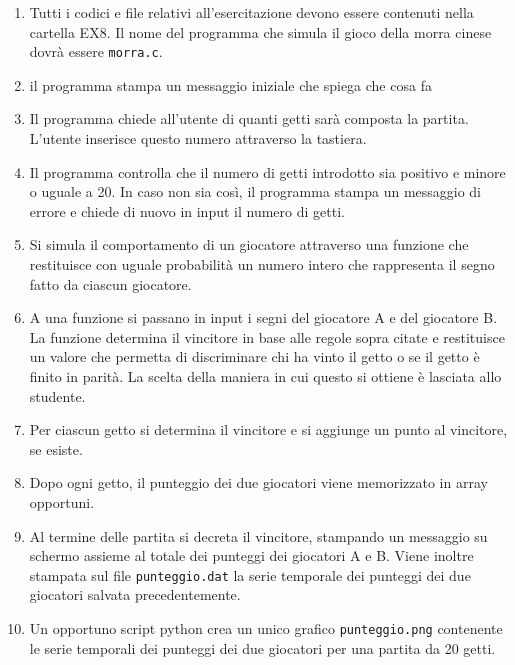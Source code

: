 \documentclass[11pt]{article}
\begin{document}
\begin{enumerate}
\item Tutti i codici e file relativi all'esercitazione devono essere contenuti nella cartella EX8. Il nome del programma che simula il gioco della morra cinese dovr\`{a} essere \texttt{morra.c}.
\item il programma stampa un messaggio iniziale che spiega che cosa fa
\item Il programma chiede all'utente di quanti getti sar\`a composta la partita.
L'utente inserisce questo numero attraverso la tastiera.
\item Il programma controlla che il numero di getti introdotto sia positivo e minore o uguale a 20. In caso non sia cos\`{i}, il programma stampa un messaggio di errore e chiede di nuovo in input il numero di getti.
\item Si simula il comportamento di un giocatore attraverso una funzione che
restituisce con uguale probabilit\`a un numero intero che rappresenta il segno
fatto da ciascun giocatore.
\item  A una funzione si passano in input i segni del giocatore A e del giocatore B. La
funzione determina il vincitore in base alle regole sopra citate e restituisce
un valore che permetta di discriminare chi ha vinto il getto o se il getto \`e finito in parit\`a. La scelta della maniera in cui questo si ottiene \`e lasciata
allo studente.
\item Per ciascun getto si determina il vincitore e si aggiunge un punto al vincitore, se esiste.
\item Dopo ogni getto, il punteggio dei due giocatori viene memorizzato in array opportuni.
\item Al termine delle partita si decreta il vincitore, stampando un messaggio su schermo assieme al totale dei punteggi dei giocatori A e B. Viene inoltre stampata sul file \texttt{punteggio.dat} la serie temporale dei punteggi dei due giocatori salvata precedentemente.
\item Un opportuno script python crea un unico grafico \texttt{punteggio.png} contenente le serie temporali dei punteggi dei due giocatori per una partita da 20 getti.

\end{enumerate}
\end{document}
